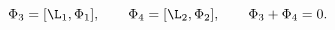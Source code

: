 \begin{equation}\label{cond1}
  \Phi_3=[\L_1,\Phi_1],\qquad\Phi_4=[\L_2,\Phi_2],\qquad
\Phi_3+\Phi_4=0.
\end{equation}

